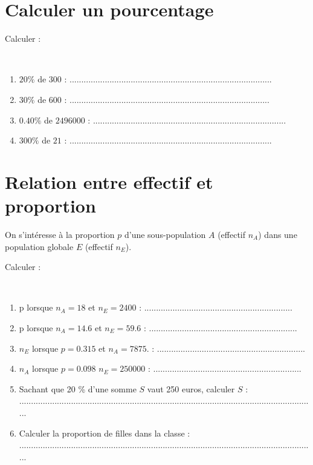 	\section{Calculer un pourcentage}
	Calculer :
	\begin{questions}
		
	
		\question[2] \ 
		
		\begin{enumerate}[label=\alph*)]
			
			\item $20 \%$ de $\num{300}$ :  ......................................................................................
			\item $30 \%$ de $\num{600}$ : .....................................................................................
			\item $\num{0.40} \%$ de $\num{2496000}$ : ..................................................................................
			\item $300 \%$ de $\num{21}$ : ......................................................................................
		\end{enumerate}
	\end{questions}
	
	
\section{Relation entre effectif et proportion}

On s'intéresse à la proportion $p$ d'une sous-population $A$ (effectif $n_A$) dans une population globale $E$ (effectif $n_E$).

Calculer :
\begin{questions}

	
	\question[6] \
	
	\begin{enumerate}[label=\alph*)]
		
		\item p lorsque $n_A=\num{18}$ et $n_E= \num{2400}$ : ...............................................................
		\item p lorsque $n_A=\num{14.6}$ et $n_E= \num{59.6} $ :  ...............................................................
		\item $n_E$ lorsque $p=\num{0.315} $ et $n_A=\num{7875}.$ : ...............................................................
		\item $n_A$ lorsque $p=\num{0.098}$ $n_E= \num{250000}$ : ...............................................................
		\item Sachant que 20 \% d'une somme $S$ vaut 250 euros, calculer $S$ :\\ ..............................................................................................................................
		\item Calculer la proportion de filles dans la classe :\\ ..............................................................................................................................
		\end{enumerate}
\end{questions}


